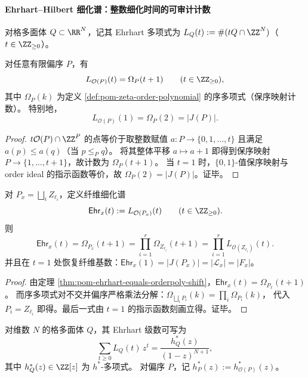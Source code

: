 \paragraph{Ehrhart--Hilbert 细化谱：整数细化时间的可审计计数}

\begin{definition}\label{def:pom-ehrhart-order-polytope}
对格多面体 \(Q\subset\RR^N\)，记其 Ehrhart 多项式为
\(
L_Q(t):=\#(tQ\cap\ZZ^N)
\)（\(t\in\ZZ_{\ge 0}\)）。
\end{definition}

\begin{theorem}[order polytope 的 Ehrhart 计数 = 序多项式（带平移）]\label{thm:pom-ehrhart-equals-orderpoly-shift}
对任意有限偏序 \(P\)，有
\[
L_{\mathcal O(P)}(t)=\Omega_P(t+1)\qquad(t\in\ZZ_{\ge 0}),
\]
其中 \(\Omega_P(k)\) 为定义 \ref{def:pom-zeta-order-polynomial} 的序多项式（保序映射计数）。
特别地，
\[
L_{\mathcal O(P)}(1)=\Omega_P(2)=|J(P)|.
\]
\end{theorem}
\begin{proof}
\(t\mathcal O(P)\cap\ZZ^P\) 的点等价于取整数赋值 \(a:P\to\{0,1,\dots,t\}\) 且满足 \(a(p)\le a(q)\)（当 \(p\le_P q\)）。
将其整体平移 \(a\mapsto a+1\) 即得到保序映射 \(P\to\{1,\dots,t+1\}\)，故计数为 \(\Omega_P(t+1)\)。
当 \(t=1\) 时，\(\{0,1\}\)-值保序映射与 order ideal 的指示函数等价，故 \(\Omega_P(2)=|J(P)|\)。证毕。
\end{proof}

\begin{corollary}\label{cor:pom-fiber-ehrhart-product}
对 \(P_x=\bigsqcup_i Z_{\ell_i}\)，定义纤维细化谱
\[
\mathsf{Ehr}_x(t):=L_{\mathcal O(P_x)}(t)\qquad(t\in\ZZ_{\ge 0}).
\]
则
\[
\mathsf{Ehr}_x(t)=\Omega_{P_x}(t+1)=\prod_{i=1}^r \Omega_{Z_{\ell_i}}(t+1)
=\prod_{i=1}^r L_{\mathcal O(Z_{\ell_i})}(t).
\]
并且在 \(t=1\) 处恢复纤维基数：\(\mathsf{Ehr}_x(1)=|J(P_x)|=|\mathcal L_x|=|F_x|\)。
\end{corollary}
\begin{proof}
由定理 \ref{thm:pom-ehrhart-equals-orderpoly-shift}，\(\mathsf{Ehr}_x(t)=\Omega_{P_x}(t+1)\)。
而序多项式对不交并偏序严格乘法分解：\(\Omega_{\bigsqcup_i P_i}(k)=\prod_i\Omega_{P_i}(k)\)，
代入 \(P_i=Z_{\ell_i}\) 即得。最后一式由 \(t=1\) 的指示函数刻画立得。证毕。
\end{proof}

\begin{definition}\label{def:pom-hstar-order-polytope}
对维数 \(N\) 的格多面体 \(Q\)，其 Ehrhart 级数可写为
\[
\sum_{t\ge 0} L_Q(t)\,z^t=\frac{h_Q^*(z)}{(1-z)^{N+1}},
\]
其中 \(h_Q^*(z)\in\ZZ[z]\) 为 \(h^*\)-多项式。
对偏序 \(P\)，记 \(h_P^*(z):=h_{\mathcal O(P)}^*(z)\)。
\end{definition}


